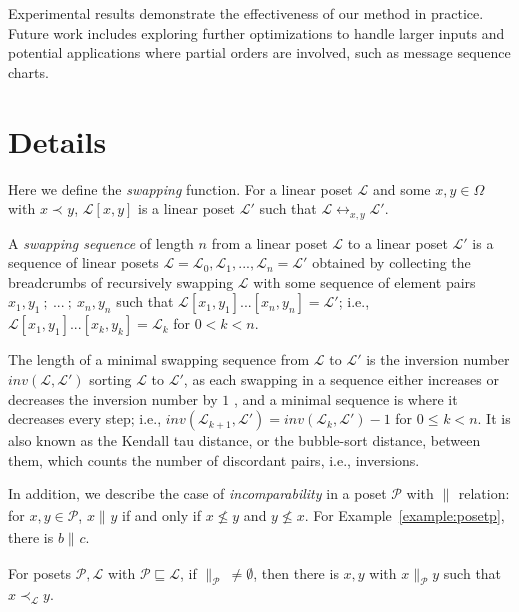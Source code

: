 \documentclass[12pt]{llncs}
\let\oldleq\leq
\renewcommand{\leq}[1][]{\oldleq_{#1}}
\newcommand{\poset}[1]{\mathcal{#1}}
\newcommand{\uni}[1][]{\Omega_{#1}}
\newcommand{\swap}[1][]{\leftrightarrow_{#1}}
\newcommand{\lext}{\sqsubseteq}
\newcommand{\incomp}[1][]{\parallel_{#1}}
\newcommand{\covered}[1][]{\prec_{#1}}
\newcommand{\swapfn}[2]{#1[#2]}
\newcommand{\inv}[2]{inv(#1,#2)}
\begin{document}
Experimental results demonstrate the effectiveness of our method in practice. Future work includes exploring further optimizations to handle larger inputs and potential applications where partial orders are involved, such as message sequence charts.

\appendix
\renewcommand{\thesection}{\appendixname~\Alph{section}}
\section{Details}
\label{appendix:connected-proof}
Here we define the \emph{swapping} function. For a linear poset $\poset{L}$ and some $x,y \!\in\! \uni$ with $x \covered y$, $\swapfn{\poset{L}}{x,y}$ is a linear poset $\poset{L}'$ such that $\poset{L} \swap[x,y] \poset{L}'$.

A \emph{swapping sequence} of length $n$ from a linear poset $\poset{L}$ to a linear poset $\poset{L}'$ is a sequence of linear posets $\poset{L} = \poset{L}_0, \poset{L}_1, ... , \poset{L}_n = \poset{L}'$ obtained by collecting the breadcrumbs of recursively swapping $\poset{L}$ with some sequence of element pairs $x_1,y_1 \ ;\  ... \ ;\  x_n,y_n$ such that $\swapfn{\poset{L}}{x_1,y_1} ... [x_n,y_n] = \poset{L}'$; i.e., $\swapfn{\poset{L}}{x_1,y_1} ... [x_k,y_k] = \poset{L}_k$ for $0 < k < n$.

The length of a minimal swapping sequence from $\poset{L}$ to $\poset{L}'$ is the inversion number $\inv{\poset{L}}{\poset{L}'}$ sorting $\poset{L}$ to $\poset{L}'$, as each swapping in a sequence either increases or decreases the inversion number by $1$ \cite{ruskey1992generating}, and a minimal sequence is where it decreases every step; i.e., $\inv{\poset{L}_{k+1}}{\poset{L}'} = \inv{\poset{L}_k}{\poset{L}'} - 1$ for $0 \leq k < n$. It is also known as the Kendall tau distance, or the bubble-sort distance, between them, which counts the number of discordant pairs, i.e., inversions.

In addition, we describe the case of \emph{incomparability} in a poset $\poset{P}$ with $\incomp$ relation: for $x, y \!\in\! \poset{P}$, $x \incomp y$ if and only if $x \nleq y$ and $y \nleq x$. For Example~\ref{example:posetp}, there is $b \incomp c$.

\begin{lemma}
    For posets $\poset{P},\poset{L}$ with $\poset{P} \lext \poset{L}$, if $\incomp[\poset{P}]\> \neq \emptyset$, then there is $x,y$ with $x \incomp[\poset{P}] y$ such that $x \covered[\poset{L}] y$.
\end{lemma}
\end{document}
